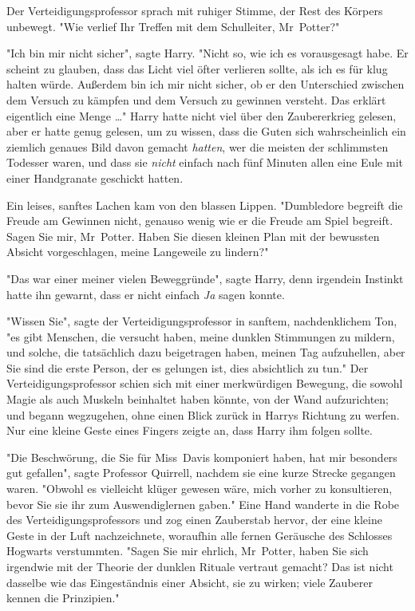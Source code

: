 {Der Verteidigungsprofessor sprach mit ruhiger Stimme, der Rest des Körpers unbewegt. "Wie verlief Ihr Treffen mit dem Schulleiter, Mr~Potter?"

"Ich bin mir nicht sicher", sagte Harry. "Nicht so, wie ich es vorausgesagt habe. Er scheint zu glauben, dass das Licht viel öfter verlieren sollte, als ich es für klug halten würde. Außerdem bin ich mir nicht sicher, ob er den Unterschied zwischen dem Versuch zu kämpfen und dem Versuch zu gewinnen versteht. Das erklärt eigentlich eine Menge …" Harry hatte nicht viel über den Zaubererkrieg gelesen, aber er hatte genug gelesen, um zu wissen, dass die Guten sich wahrscheinlich ein ziemlich genaues Bild davon gemacht \emph{hatten}, wer die meisten der schlimmsten Todesser waren, und dass sie \emph{nicht} einfach nach fünf Minuten allen eine Eule mit einer Handgranate geschickt hatten.

Ein leises, sanftes Lachen kam von den blassen Lippen. "Dumbledore begreift die Freude am Gewinnen nicht, genauso wenig wie er die Freude am Spiel begreift. Sagen Sie mir, Mr~Potter. Haben Sie diesen kleinen Plan mit der bewussten Absicht vorgeschlagen, meine Langeweile zu lindern?"

"Das war einer meiner vielen Beweggründe", sagte Harry, denn irgendein Instinkt hatte ihn gewarnt, dass er nicht einfach \emph{Ja} sagen konnte.

"Wissen Sie", sagte der Verteidigungsprofessor in sanftem, nachdenklichem Ton, "es gibt Menschen, die versucht haben, meine dunklen Stimmungen zu mildern, und solche, die tatsächlich dazu beigetragen haben, meinen Tag aufzuhellen, aber Sie sind die erste Person, der es gelungen ist, dies absichtlich zu tun." Der Verteidigungsprofessor schien sich mit einer merkwürdigen Bewegung, die sowohl Magie als auch Muskeln beinhaltet haben könnte, von der Wand aufzurichten; und begann wegzugehen, ohne einen Blick zurück in Harrys Richtung zu werfen. Nur eine kleine Geste eines Fingers zeigte an, dass Harry ihm folgen sollte.

"Die Beschwörung, die Sie für Miss~Davis komponiert haben, hat mir besonders gut gefallen", sagte Professor Quirrell, nachdem sie eine kurze Strecke gegangen waren. "Obwohl es vielleicht klüger gewesen wäre, mich vorher zu konsultieren, bevor Sie sie ihr zum Auswendiglernen gaben." Eine Hand wanderte in die Robe des Verteidigungsprofessors und zog einen Zauberstab hervor, der eine kleine Geste in der Luft nachzeichnete, woraufhin alle fernen Geräusche des Schlosses Hogwarts verstummten. "Sagen Sie mir ehrlich, Mr~Potter, haben Sie sich irgendwie mit der Theorie der dunklen Rituale vertraut gemacht? Das ist nicht dasselbe wie das Eingeständnis einer Absicht, sie zu wirken; viele Zauberer kennen die Prinzipien."

}
